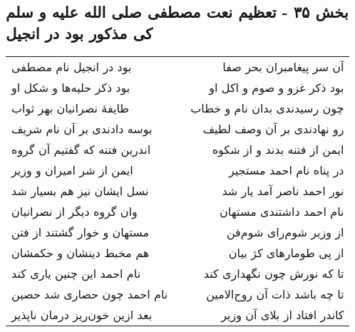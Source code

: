 \begin{center}
\section*{بخش ۳۵ - تعظیم نعت مصطفی صلی الله علیه و سلم کی مذکور بود در انجیل}
\label{sec:sh035}
\begin{longtable}{l p{0.5cm} r}
بود در انجیل نام مصطفی
&&
آن سر پیغامبران بحر صفا
\\
بود ذکر حلیه‌ها و شکل او
&&
بود ذکر غزو و صوم و اکل او
\\
طایفهٔ نصرانیان بهر ثواب
&&
چون رسیدندی بدان نام و خطاب
\\
بوسه دادندی بر آن نام شریف
&&
رو نهادندی بر آن وصف لطیف
\\
اندرین فتنه که گفتیم آن گروه
&&
ایمن از فتنه بدند و از شکوه
\\
ایمن از شر امیران و وزیر
&&
در پناه نام احمد مستجیر
\\
نسل ایشان نیز هم بسیار شد
&&
نور احمد ناصر آمد یار شد
\\
وان گروه دیگر از نصرانیان
&&
نام احمد داشتندی مستهان
\\
مستهان و خوار گشتند از فتن
&&
از وزیر شوم‌رای شوم‌فن
\\
هم مخبط دینشان و حکمشان
&&
از پی طومارهای کژ بیان
\\
نام احمد این چنین یاری کند
&&
تا که نورش چون نگهداری کند
\\
نام احمد چون حصاری شد حصین
&&
تا چه باشد ذات آن روح‌الامین
\\
بعد ازین خون‌ریز درمان ناپذیر
&&
کاندر افتاد از بلای آن وزیر
\\
\end{longtable}
\end{center}
